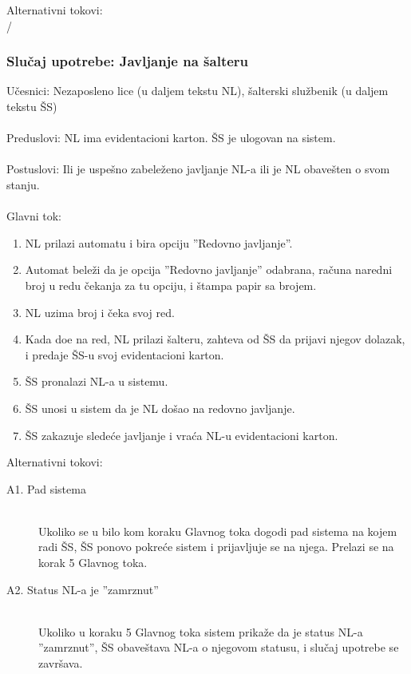 \noindent Alternativni tokovi: 
\\/

\subsubsection{Slu\v caj upotrebe: Javljanje na \v salteru}
\label{su: javljanje na salteru}

\noindent U\v cesnici: Nezaposleno lice (u daljem tekstu NL), \v salterski slu\v zbenik (u daljem tekstu \v SS)
\\
\\ Preduslovi: NL ima evidentacioni karton. \v SS je ulogovan na sistem. 
\\
\\ Postuslovi: Ili je uspe\v sno zabele\v zeno javljanje NL-a ili je NL obave\v sten o svom stanju.
\\ 
\\ Glavni tok:
\begin{enumerate}
	\item NL prilazi automatu i bira opciju ''Redovno javljanje''.
	\item Automat bele\v zi da je opcija ''Redovno javljanje'' odabrana, ra\v cuna naredni broj u redu \v cekanja za tu opciju, i \v stampa papir sa brojem.
	\item NL uzima broj i \v ceka svoj red.
	\item Kada do\dj e na red, NL prilazi \v salteru, zahteva od \v SS da prijavi njegov dolazak, i predaje \v SS-u svoj evidentacioni karton.
	\item \v SS pronalazi NL-a u sistemu.
	\item \v SS unosi u sistem da je NL do\v sao na redovno javljanje.
	\item \v SS zakazuje slede\' ce javljanje i vra\' ca NL-u evidentacioni karton.
\end{enumerate}

\noindent Alternativni tokovi: 
\begin{description}
	\item[A1. Pad sistema] ~\\
	Ukoliko se u bilo kom koraku Glavnog toka dogodi pad sistema na kojem radi \v SS, \v SS ponovo pokre\'ce sistem i prijavljuje se na njega. Prelazi se na korak 5 Glavnog toka.
	
	\item[A2. Status NL-a je ''zamrznut''] ~\\
	Ukoliko u koraku 5 Glavnog toka sistem prika\v ze da je status NL-a ''zamrznut'', \v SS obave\v stava NL-a o njegovom statusu, i slu\v caj upotrebe se zavr\v sava.
\end{description}

